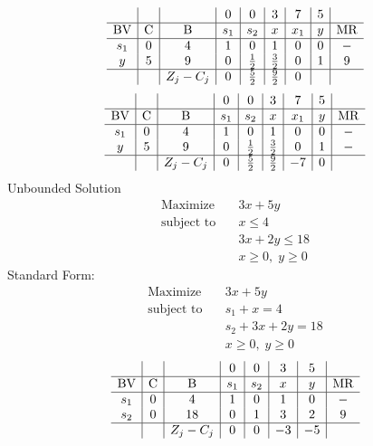\documentclass{article}
\begin{document}
\begin{align*}
\begin{array}{c|c|c|c|c|c|c|c|c}
 &  &  & 0 & 0 & 3 & 7 & 5 & \\
\hline
\text{BV} & \text{C} & \text{B} & s_{1} & s_{2} & x & x_{1} & y & \text{MR} \\
\hline
s_{1} & 0 & 4 & 1 & 0 & 1 & 0 & 0 & - \\
y & 5 & 9 & 0 & \frac{1}{2} & \frac{3}{2} & 0 & 1 & 9 \\
\hline
 &  & Z_j-C_j & 0 & \frac{5}{2} & \frac{9}{2} & 0 & \\
\end{array}
\end{align*}
\begin{align*}
\begin{array}{c|c|c|c|c|c|c|c|c}
 &  &  & 0 & 0 & 3 & 7 & 5 & \\
\hline
\text{BV} & \text{C} & \text{B} & s_{1} & s_{2} & x & x_{1} & y & \text{MR} \\
\hline
s_{1} & 0 & 4 & 1 & 0 & 1 & 0 & 0 & - \\
y & 5 & 9 & 0 & \frac{1}{2} & \frac{3}{2} & 0 & 1 & - \\
\hline
 &  & Z_j-C_j & 0 & \frac{5}{2} & \frac{9}{2} & -7 & 0 & \\
\end{array}
\end{align*}
Unbounded Solution\\
\begin{align*}
\text{Maximize} \quad & 3x + 5y\\
\text{subject to} \quad
& x\le4\\
& 3x + 2y\le18\\
& x\ge0,\; y\ge0\end{align*}
Standard Form:\\
\begin{align*}
\text{Maximize} \quad & 3x + 5y\\
\text{subject to} \quad
& s_{1} + x=4\\
& s_{2} + 3x + 2y=18\\
& x\ge0,\; y\ge0\end{align*}
\begin{align*}
\begin{array}{c|c|c|c|c|c|c|c}
 &  &  & 0 & 0 & 3 & 5 & \\
\hline
\text{BV} & \text{C} & \text{B} & s_{1} & s_{2} & x & y & \text{MR} \\
\hline
s_{1} & 0 & 4 & 1 & 0 & 1 & 0 & - \\
s_{2} & 0 & 18 & 0 & 1 & 3 & 2 & 9 \\
\hline
 &  & Z_j-C_j & 0 & 0 & -3 & -5 & \\
\end{array}
\end{align*}
\end{document}
